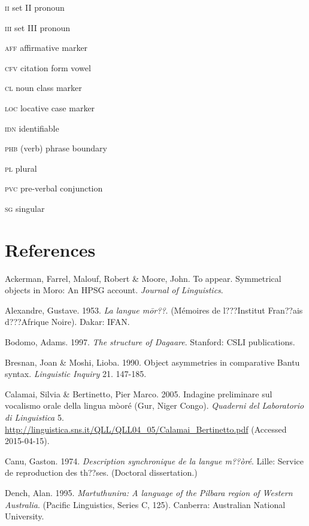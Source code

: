 \documentclass[output=paper]{langsci/langscibook}
\begin{document}
\textsc{ii  }set II pronoun



\textsc{iii  }set III pronoun



\textsc{aff}  affirmative marker



\textsc{cfv}  citation form vowel



\textsc{cl  }noun class marker



\textsc{loc  }locative case marker



\textsc{idn  }identifiable



\textsc{phb  }(verb) phrase boundary



\textsc{pl  }plural



\textsc{pvc  }pre-verbal conjunction



\textsc{sg  }singular


\section{References}

Ackerman, Farrel, Malouf, Robert \& Moore, John. To appear. Symmetrical objects in Moro: An HPSG account. \textit{Journal of Linguistics}. 

Alexandre, Gustave. 1953. \textit{La langue m\=or??}. (Mémoires de l???Institut Fran??ais d???Afrique Noire). Dakar: IFAN. 

Bodomo, Adams. 1997. \textit{The structure of Dagaare}. Stanford: CSLI publications.

Bresnan, Joan \& Moshi, Lioba. 1990. Object asymmetries in comparative Bantu syntax. \textit{Linguistic Inquiry} 21. 147-185. 

Calamai, Silvia \& Bertinetto, Pier Marco. 2005. Indagine preliminare sul vocalismo orale della lingua mòoré (Gur, Niger Congo). \textit{Quaderni del Laboratorio di Linguistica} 5. \url{http://linguistica.sns.it/QLL/QLL04_05/Calamai_Bertinetto.pdf} (Accessed 2015-04-15). 

Canu, Gaston. 1974. \textit{Description synchronique de la langue m??òré}. Lille: Service de reproduction des th??ses. (Doctoral dissertation.)

Dench, Alan. 1995. \textit{Martuthunira: A language of the Pilbara region of Western Australia}. (Pacific Linguistics, Series C, 125). Canberra: Australian National University.  
\end{document}
